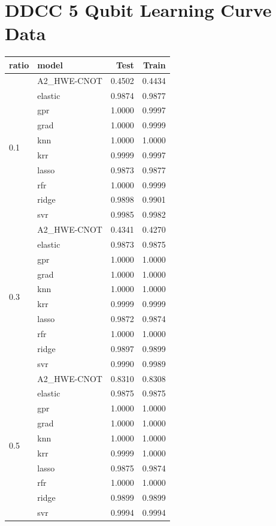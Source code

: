 \documentclass[journal=jacsat,manuscript=article]{achemso}
\begin{document}
\section{DDCC 5 Qubit Learning Curve Data}\label{section:5DDCC_LC_data}
\begin{longtable}{llrr}
	\toprule
	ratio & model & Test & Train \\
	\midrule
	\midrule
	\multirow[t]{10}{*}{0.1} & A2{\_}HWE-CNOT & 0.4502 & 0.4434 \\
	& elastic & 0.9874 & 0.9877 \\
	& gpr & 1.0000 & 0.9997 \\
	& grad & 1.0000 & 0.9999 \\
	& knn & 1.0000 & 1.0000 \\
	& krr & 0.9999 & 0.9997 \\
	& lasso & 0.9873 & 0.9877 \\
	& rfr & 1.0000 & 0.9999 \\
	& ridge & 0.9898 & 0.9901 \\
	& svr & 0.9985 & 0.9982 \\
	\cline{1-4}
	\multirow[t]{10}{*}{0.3} & A2{\_}HWE-CNOT & 0.4341 & 0.4270 \\
	& elastic & 0.9873 & 0.9875 \\
	& gpr & 1.0000 & 1.0000 \\
	& grad & 1.0000 & 1.0000 \\
	& knn & 1.0000 & 1.0000 \\
	& krr & 0.9999 & 0.9999 \\
	& lasso & 0.9872 & 0.9874 \\
	& rfr & 1.0000 & 1.0000 \\
	& ridge & 0.9897 & 0.9899 \\
	& svr & 0.9990 & 0.9989 \\
	\cline{1-4}
	\multirow[t]{10}{*}{0.5} & A2{\_}HWE-CNOT & 0.8310 & 0.8308 \\
	& elastic & 0.9875 & 0.9875 \\
	& gpr & 1.0000 & 1.0000 \\
	& grad & 1.0000 & 1.0000 \\
	& knn & 1.0000 & 1.0000 \\
	& krr & 0.9999 & 1.0000 \\
	& lasso & 0.9875 & 0.9874 \\
	& rfr & 1.0000 & 1.0000 \\
	& ridge & 0.9899 & 0.9899 \\
	& svr & 0.9994 & 0.9994 \\

\end{longtable}
\end{document}
